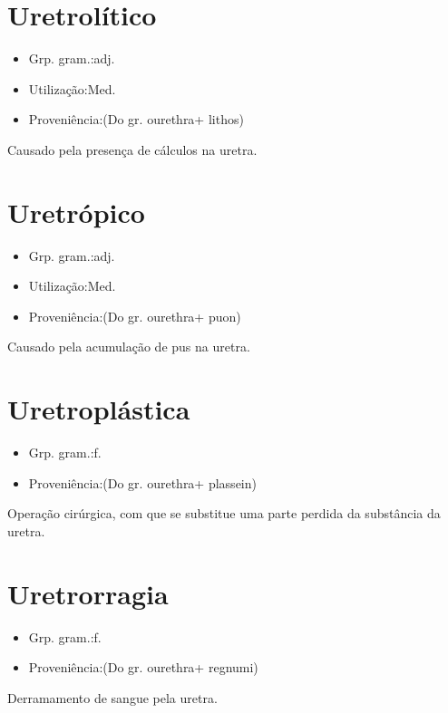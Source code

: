 \documentclass{article}
\begin{document}
\section{Uretrolítico}
\begin{itemize}
\item {Grp. gram.:adj.}
\end{itemize}
\begin{itemize}
\item {Utilização:Med.}
\end{itemize}
\begin{itemize}
\item {Proveniência:(Do gr. \textunderscore ourethra\textunderscore  + \textunderscore lithos\textunderscore )}
\end{itemize}
Causado pela presença de cálculos na uretra.
\section{Uretrópico}
\begin{itemize}
\item {Grp. gram.:adj.}
\end{itemize}
\begin{itemize}
\item {Utilização:Med.}
\end{itemize}
\begin{itemize}
\item {Proveniência:(Do gr. \textunderscore ourethra\textunderscore  + \textunderscore puon\textunderscore )}
\end{itemize}
Causado pela acumulação de pus na uretra.
\section{Uretroplástica}
\begin{itemize}
\item {Grp. gram.:f.}
\end{itemize}
\begin{itemize}
\item {Proveniência:(Do gr. \textunderscore ourethra\textunderscore  + \textunderscore plassein\textunderscore )}
\end{itemize}
Operação cirúrgica, com que se substitue uma parte perdida da substância da uretra.
\section{Uretrorragia}
\begin{itemize}
\item {Grp. gram.:f.}
\end{itemize}
\begin{itemize}
\item {Proveniência:(Do gr. \textunderscore ourethra\textunderscore  + \textunderscore regnumi\textunderscore )}
\end{itemize}
Derramamento de sangue pela uretra.
\end{document}
